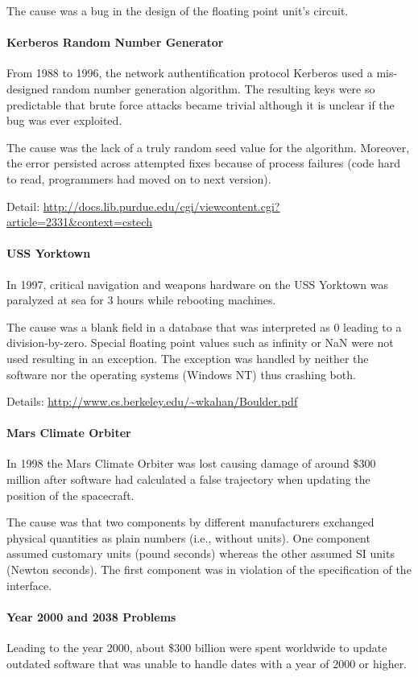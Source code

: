 The cause was a bug in the design of the floating point unit's circuit.

\paragraph{Kerberos Random Number Generator}
From 1988 to 1996, the network authentification protocol Kerberos used a mis-designed random number generation algorithm.
The resulting keys were so predictable that brute force attacks became trivial although it is unclear if the bug was ever exploited.

The cause was the lack of a truly random seed value for the algorithm.
Moreover, the error persisted across attempted fixes because of process failures (code hard to read, programmers had moved on to next version).

Detail: \url{http://docs.lib.purdue.edu/cgi/viewcontent.cgi?article=2331&context=cstech}

\paragraph{USS Yorktown}
In 1997, critical navigation and weapons hardware on the USS Yorktown was paralyzed at sea for $3$ hours while rebooting machines.

The cause was a blank field in a database that was interpreted as $0$ leading to a division-by-zero.
Special floating point values such as infinity or NaN were not used resulting in an exception.
The exception was handled by neither the software nor the operating systems (Windows NT) thus crashing both.

Details: \url{http://www.cs.berkeley.edu/~wkahan/Boulder.pdf}

\paragraph{Mars Climate Orbiter}
In 1998 the Mars Climate Orbiter was lost causing damage of around \$$300$ million after software had calculated a false trajectory when updating the position of the spacecraft.

The cause was that two components by different manufacturers exchanged physical quantities as plain numbers (i.e., without units).
One component assumed customary units (pound seconds) whereas the other assumed SI units (Newton seconds).
The first component was in violation of the specification of the interface.

\paragraph{Year 2000 and 2038 Problems}
Leading to the year 2000, about \$$300$ billion were spent worldwide to update outdated software that was unable to handle dates with a year of $2000$ or higher.

